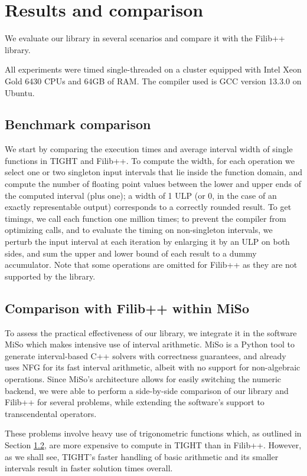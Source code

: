 \section{Results and comparison}
We evaluate our library in several scenarios and compare it with the Filib++ library.

All experiments were timed single-threaded on a cluster equipped with Intel Xeon Gold 6430 CPUs and 64GB of RAM.
The compiler used is GCC version 13.3.0 on Ubuntu.

\subsection{Benchmark comparison}
We start by comparing the execution times and average interval width of single functions in TIGHT and Filib++.
To compute the width, for each operation we select one or two singleton input intervals that lie inside the function domain, and compute the number of floating point values between the lower and upper ends of the computed interval (plus one); a width of 1 ULP (or 0, in the case of an exactly representable output) corresponds to a correctly rounded result.
To get timings, we call each function one million times; to prevent the compiler from optimizing calls, and to evaluate the timing on non-singleton intervals, we perturb the input interval at each iteration by enlarging it by an ULP on both sides, and sum the upper and lower bound of each result to a dummy accumulator.
Note that some operations are omitted for Filib++ as they are not supported by the library.



\subsection{Comparison with Filib++ within MiSo}
To assess the practical effectiveness of our library, we integrate it in the software MiSo \cite{miso} which makes intensive use of interval arithmetic.
MiSo is a Python tool to generate interval-based C++ solvers with correctness guarantees, and already uses NFG for its fast interval arithmetic, albeit with no support for non-algebraic operations.
Since MiSo's architecture allows for easily switching the numeric backend, we were able to perform a side-by-side comparison of our library and Filib++ for several problems, while extending the software's support to transcendental operators.

These problems involve heavy use of trigonometric functions which, as outlined in Section \ref{}, are more expensive to compute in TIGHT than in Filib++.
However, as we shall see, TIGHT's faster handling of basic arithmetic and its smaller intervals result in faster solution times overall.

